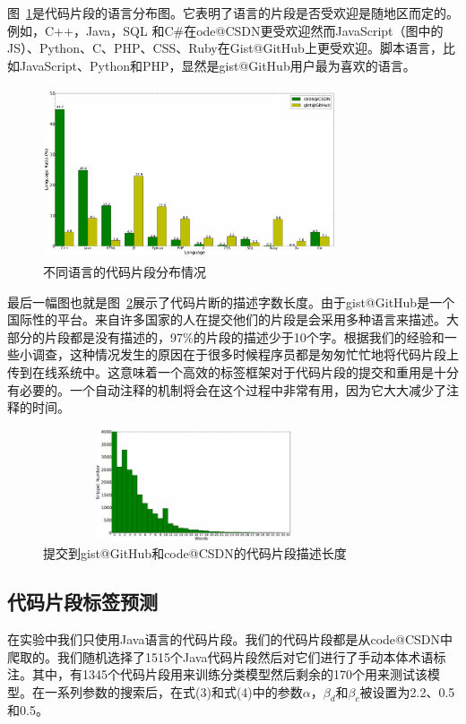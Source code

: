 \documentclass[10pt,journal,draftcls,onecolumn]{IEEEtran}
\begin{document}
\begin{CJK*}{UTF8}{gbsn}
图~\ref{snippet_language}是代码片段的语言分布图。它表明了语言的片段是否受欢迎是随地区而定的。例如，C++，Java，SQL
和C$\#$在ode@CSDN更受欢迎然而JavaScript（图中的JS）、Python、C、PHP、CSS、Ruby在Gist@GitHub上更受欢迎。脚本语言，比如JavaScript、Python和PHP，显然是gist@GitHub用户最为喜欢的语言。

\begin{figure}
\centering
  \includegraphics[height=2in,width=3.4in]{languages.eps}
  \caption{不同语言的代码片段分布情况}\label{snippet_language}
\end{figure}

最后一幅图也就是图~\ref{snippet_description}展示了代码片断的描述字数长度。由于gist@GitHub是一个国际性的平台。来自许多国家的人在提交他们的片段是会采用多种语言来描述。大部分的片段都是没有描述的，97$\%$的片段的描述少于10个字。根据我们的经验和一些小调查，这种情况发生的原因在于很多时候程序员都是匆匆忙忙地将代码片段上传到在线系统中。这意味着一个高效的标签框架对于代码片段的提交和重用是十分有必要的。一个自动注释的机制将会在这个过程中非常有用，因为它大大减少了注释的时间。
\begin{figure}
\centering
  \includegraphics[height=1.3in,width=3.5in]{description.eps}
  \caption{提交到gist@GitHub和code@CSDN的代码片段描述长度}\label{snippet_description}
\end{figure}

\subsection{代码片段标签预测}
在实验中我们只使用Java语言的代码片段。我们的代码片段都是从code@CSDN中爬取的。我们随机选择了1515个Java代码片段然后对它们进行了手动本体术语标注。其中，有1345个代码片段用来训练分类模型然后剩余的170个用来测试该模型。在一系列参数的搜索后，在式(3)和式(4)中的参数$\alpha$，$\beta_d$和$\beta_c$被设置为2.2、0.5和0.5。


\end{CJK*}
\end{document}
